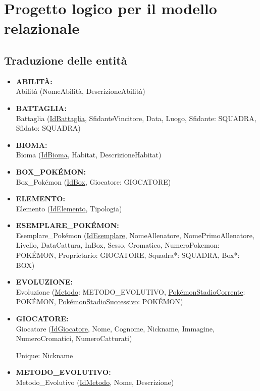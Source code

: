 \documentclass[a4paper,12pt]{report}
\begin{document}
\chapter{Progetto logico per il modello relazionale}

\section{Traduzione delle entità}

\begin{itemize}
\item \textbf{ABILITÀ:} \\
Abilità (NomeAbilità, DescrizioneAbilità)

\item \textbf{BATTAGLIA:} \\
Battaglia (\underline{IdBattaglia}, SfidanteVincitore, Data, Luogo, Sfidante: SQUADRA, Sfidato: SQUADRA)

\item \textbf{BIOMA:} \\
Bioma (\underline{IdBioma}, Habitat, DescrizioneHabitat)

\item \textbf{BOX\_POKÉMON:} \\
Box\_Pokémon (\underline{IdBox}, Giocatore: GIOCATORE)

\item \textbf{ELEMENTO:} \\
Elemento (\underline{IdElemento}, Tipologia)

\item \textbf{ESEMPLARE\_POKÉMON:} \\
Esemplare\_Pokémon (\underline{IdEsemplare}, NomeAllenatore, NomePrimoAllenatore, Livello, DataCattura, InBox, Sesso, Cromatico, NumeroPokemon: POKÉMON, Proprietario: GIOCATORE, Squadra*: SQUADRA, Box*: BOX)

\item \textbf{EVOLUZIONE:} \\
Evoluzione (\underline{Metodo}: METODO\_EVOLUTIVO, \underline{PokémonStadioCorrente}: POKÉMON, \underline{PokémonStadioSuccessivo}: POKÉMON) 

\item \textbf{GIOCATORE:} \\
Giocatore (\underline{IdGiocatore}, Nome, Cognome, Nickname, Immagine, NumeroCromatici, NumeroCatturati)

\quad Unique: Nickname

\item \textbf{METODO\_EVOLUTIVO:} \\
Metodo\_Evolutivo (\underline{IdMetodo}, Nome, Descrizione)


\end{itemize}
\end{document}
